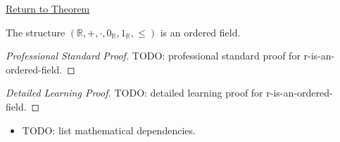 \newpage
{}
\label{prf:r-is-an-ordered-field}

\begin{remark*}[Return]
\hyperref[thm:r-is-an-ordered-field]{Return to Theorem}
\end{remark*}

\begin{theorem*}
The structure $(\mathbb{R},+,\cdot,0_{\mathbb{R}},1_{\mathbb{R}},\le)$ is an
ordered field.
\end{theorem*}

\begin{proof}[Professional Standard Proof]
\LRAProofBodyStart
TODO: professional standard proof for r-is-an-ordered-field.
\end{proof}

\begin{proof}[Detailed Learning Proof]
\LRAProofBodyStart
TODO: detailed learning proof for r-is-an-ordered-field.
\end{proof}

\begin{remark*}
\end{remark*}

\begin{dependencies}
\begin{itemize}
  \item TODO: list mathematical dependencies.
\end{itemize}
\end{dependencies}

\clearpage
